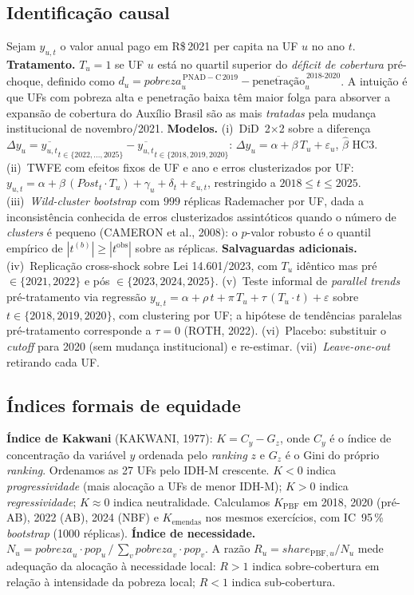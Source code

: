 \documentclass[12pt,a4paper,oneside]{article}
\newcommand{\rs}{R\$\,}
\begin{document}
\subsection{Identificação causal}

Sejam $y_{u,t}$ o valor anual pago em \rs 2021 per capita na UF $u$
no ano $t$. \textbf{Tratamento.} $T_u = 1$ se UF $u$ está no quartil
superior do \textit{déficit de cobertura} pré-choque, definido como
$d_u = \mathit{pobreza}_u^{\,\mathrm{PNAD-C\,2019}} - \overline{\text{penetração}}_u^{\,2018\text{-}2020}$.
A intuição é que UFs com pobreza alta e penetração baixa têm maior
folga para absorver a expansão de cobertura do Auxílio Brasil
\textemdash{} são as mais \textit{tratadas} pela mudança institucional
de novembro/2021. \textbf{Modelos.}
(i)~DiD~2$\times$2 sobre a diferença
$\Delta y_u = \overline{y_{u,t}}_{t \in \{2022,...,2025\}} - \overline{y_{u,t}}_{t \in \{2018,2019,2020\}}$:
$\Delta y_u = \alpha + \beta\,T_u + \varepsilon_u$, $\hat{\beta}$
HC3.
(ii)~TWFE com efeitos fixos de UF e ano e erros clusterizados por
UF: $y_{u,t} = \alpha + \beta\,(\mathit{Post}_t \cdot T_u)
+ \gamma_u + \delta_t + \varepsilon_{u,t}$, restringido a
$2018 \leq t \leq 2025$.
(iii)~\textit{Wild-cluster bootstrap} com $999$ réplicas Rademacher
por UF, dada a inconsistência conhecida de erros clusterizados
assintóticos quando o número de \textit{clusters} é
pequeno (CAMERON et al., 2008): o $p$-valor robusto é o
quantil empírico de $|t^{(b)}| \geq |t^{\mathrm{obs}}|$ sobre as
réplicas.
\textbf{Salvaguardas adicionais.}
(iv)~Replicação cross-shock sobre Lei 14.601/2023, com
$T_u$ idêntico mas pré $\in \{2021,2022\}$ e pós $\in \{2023,2024,2025\}$.
(v)~Teste informal de \textit{parallel trends} pré-tratamento via
regressão $y_{u,t} = \alpha + \rho\,t + \pi\,T_u + \tau\,(T_u \cdot t)
+ \varepsilon$ sobre $t \in \{2018,2019,2020\}$, com clustering por
UF; a hipótese de tendências paralelas pré-tratamento corresponde
a $\tau = 0$ (ROTH, 2022).
(vi)~Placebo: substituir o \textit{cutoff} para 2020 (sem mudança
institucional) e re-estimar.
(vii)~\textit{Leave-one-out} retirando cada UF.

\subsection{Índices formais de equidade}

\textbf{Índice de Kakwani} (KAKWANI, 1977): $K = C_y - G_z$, onde
$C_y$ é o índice de concentração da variável $y$ ordenada pelo
\textit{ranking} $z$ e $G_z$ é o Gini do próprio \textit{ranking}.
Ordenamos as 27 UFs pelo IDH-M crescente. $K < 0$ indica
\textit{progressividade} (mais alocação a UFs de menor IDH-M);
$K > 0$ indica \textit{regressividade}; $K \approx 0$ indica
neutralidade. Calculamos $K_{\mathrm{PBF}}$ em 2018, 2020 (pré-AB),
2022 (AB), 2024 (NBF) e $K_{\mathrm{emendas}}$ nos mesmos
exercícios, com IC~95\,\% \textit{bootstrap} (1000 réplicas).
\textbf{Índice de necessidade.}
$N_u = \mathit{pobreza}_u \cdot \mathit{pop}_u\,/\,\sum_v
\mathit{pobreza}_v \cdot \mathit{pop}_v$.
A razão $R_u = \mathit{share}_{\mathrm{PBF},u} / N_u$ mede
adequação da alocação à necessidade local: $R > 1$ indica
sobre-cobertura em relação à intensidade da pobreza local;
$R < 1$ indica sub-cobertura.
\end{document}
